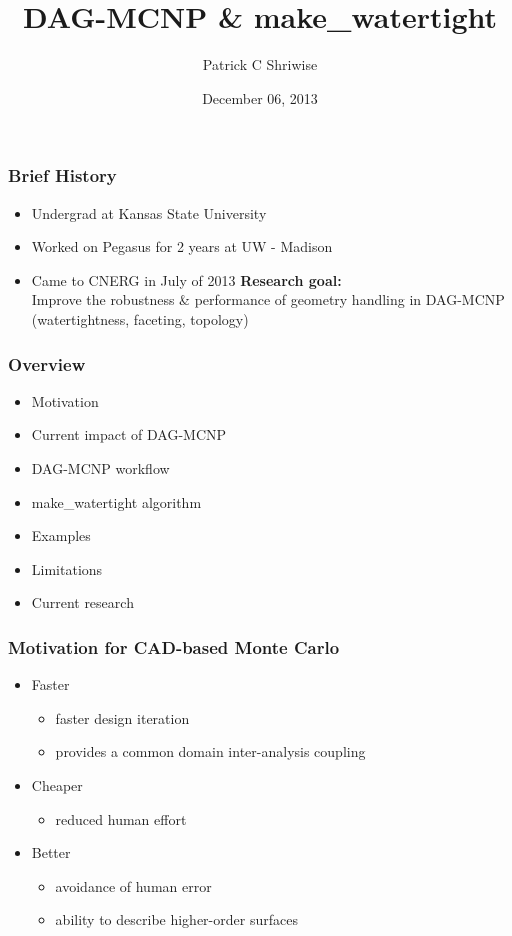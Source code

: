 \documentclass[14pt]{beamer}
\begin{document}
\title{DAG-MCNP \& make\_watertight}
\author{Patrick C Shriwise}
\date{December 06, 2013}

\maketitle


\begin{frame}
\frametitle{Brief History}
\begin{itemize}
\item Undergrad at Kansas State University
\item Worked on Pegasus for 2 years at UW - Madison
\item Came to CNERG in July of 2013
\vfill
\textbf{Research goal:} \\
Improve the robustness \& performance of geometry handling in DAG-MCNP\\
(watertightness, faceting, topology)
\end{itemize}
\end{frame}

\begin{frame}
\frametitle{Overview}

\begin{itemize}

\item Motivation
\item Current impact of DAG-MCNP
\item DAG-MCNP workflow
\item make\_watertight algorithm
\item Examples
\item Limitations
\item Current research

\end{itemize}
\end{frame}

\begin{frame}
\frametitle{Motivation for CAD-based Monte Carlo}
\begin{itemize}
\vfill
\item Faster
	\begin{itemize}
	\item faster design iteration
	\item provides a common domain inter-analysis coupling
	\end{itemize}
\vfill
\item Cheaper
	\begin{itemize}
	\item reduced human effort
	\end{itemize}
\vfill
\item Better
	\begin{itemize}
	\item avoidance of human error
	\item ability to describe higher-order surfaces
	\end{itemize}
\end{itemize}

\end{frame}
\end{document}
